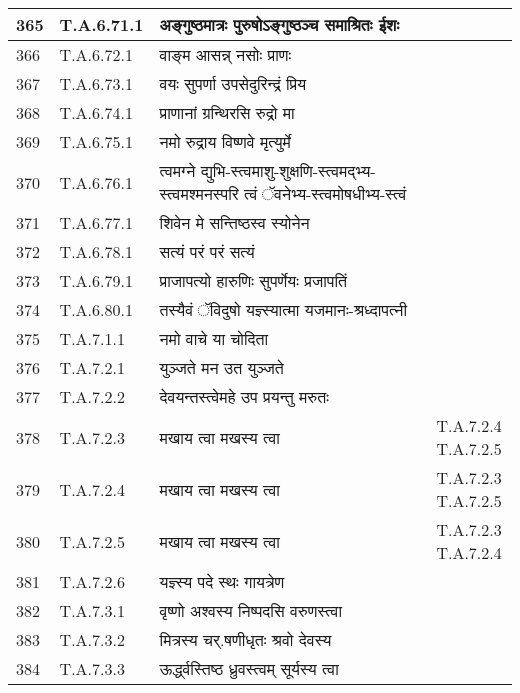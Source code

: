 \documentclass[17pt]{extarticle}
\begin{document}
\begin{longtable}{||p{0.4in}||p{0.9in}||p{4.0in}||p{0.9in}||}
        \hline
            365 & T.A.6.71.1 & अङ्गुष्ठमात्रः पुरुषोऽङ्गुष्ठञ्च समाश्रितः ईशः &      \\
        \hline
            366 & T.A.6.72.1 & वाङ्म आसन्न् नसोः प्राणः &      \\
        \hline
            367 & T.A.6.73.1 & वयः सुपर्णा उपसेदुरिन्द्रं प्रिय &      \\
        \hline
            368 & T.A.6.74.1 & प्राणानां ग्रन्थिरसि रुद्रो मा &      \\
        \hline
            369 & T.A.6.75.1 & नमो रुद्राय विष्णवे मृत्युर्मे &      \\
        \hline
            370 & T.A.6.76.1 & त्वमग्ने द्युभि{-}स्त्वमाशु{-}शुक्षणि{-}स्त्वमद्भ्य{-}स्त्वमश्मनस्परि त्वं ॅवनेभ्य{-}स्त्वमोषधीभ्य{-}स्त्वं &      \\
        \hline
            371 & T.A.6.77.1 & शिवेन मे सन्तिष्ठस्व स्योनेन &      \\
        \hline
            372 & T.A.6.78.1 & सत्यं परं परं सत्यं &      \\
        \hline
            373 & T.A.6.79.1 & प्राजापत्यो हारुणिः सुपर्णेयः प्रजापतिं &      \\
        \hline
            374 & T.A.6.80.1 & तस्यैवं ॅविदुषो यज्ञ्स्यात्मा यजमानः{-}श्रध्दापत्नी &      \\
        \hline
            375 & T.A.7.1.1 & नमो वाचे या चोदिता &      \\
        \hline
            376 & T.A.7.2.1 & युञ्जते मन उत युञ्जते &      \\
        \hline
            377 & T.A.7.2.2 & देवयन्तस्त्वेमहे उप प्रयन्तु मरुतः &      \\
        \hline
            378 & T.A.7.2.3 & मखाय त्वा मखस्य त्वा &  T.A.7.2.4 T.A.7.2.5       \\
        \hline
            379 & T.A.7.2.4 & मखाय त्वा मखस्य त्वा & T.A.7.2.3  T.A.7.2.5       \\
        \hline
            380 & T.A.7.2.5 & मखाय त्वा मखस्य त्वा & T.A.7.2.3 T.A.7.2.4        \\
        \hline
            381 & T.A.7.2.6 & यज्ञ्स्य पदे स्थः गायत्रेण &      \\
        \hline
            382 & T.A.7.3.1 & वृष्णो अश्वस्य निष्पदसि वरुणस्त्वा &      \\
        \hline
            383 & T.A.7.3.2 & मित्रस्य चर्.षणीधृतः श्रवो देवस्य &      \\
        \hline
            384 & T.A.7.3.3 & ऊर्द्ध्वस्तिष्ठ ध्रुवस्त्वम् सूर्यस्य त्वा &      \\

\end{longtable}
\end{document}
